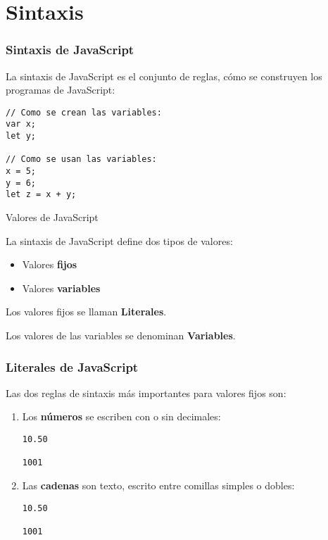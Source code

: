 
\section{Sintaxis}

\begin{frame}[fragile]
  \frametitle{Sintaxis de JavaScript}

  La sintaxis de JavaScript es el conjunto de reglas,
  cómo se construyen los programas de JavaScript:

  \vspace{\baselineskip}
  \begin{lstlisting}
// Como se crean las variables:
var x;
let y;

// Como se usan las variables:
x = 5;
y = 6;
let z = x + y;
  \end{lstlisting}
\end{frame}

\begin{frame}[c]{Valores de JavaScript}

  La sintaxis de JavaScript define dos tipos de valores:

  \begin{itemize}
    \item Valores \textbf{fijos}
    \item Valores \textbf{variables}
  \end{itemize}

  \vspace{\baselineskip}
  Los valores fijos se llaman \textbf{Literales}.

  \vspace{\baselineskip}
  Los valores de las variables se denominan \textbf{Variables}.
\end{frame}


\begin{frame}[fragile]
  \frametitle{Literales de JavaScript}

  Las dos reglas de sintaxis más importantes para valores fijos son:

  \begin{enumerate}
    \item Los \textbf{números} se escriben con o sin decimales:
          \vspace{\baselineskip}
          \begin{lstlisting}
10.50

1001
          \end{lstlisting}
    \item Las \textbf{cadenas} son texto, escrito entre comillas
          simples o dobles:
          \vspace{\baselineskip}
          \begin{lstlisting}
10.50

1001
          \end{lstlisting}
  \end{enumerate}
\end{frame}


